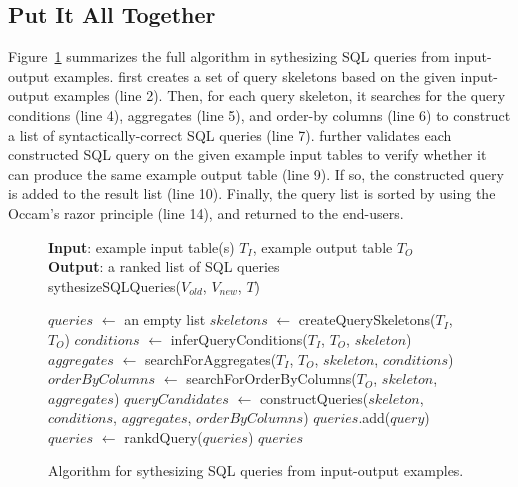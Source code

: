 \subsection{Put It All Together}
\label{sec:algorithm}

Figure~\ref{fig:algorithm} summarizes the full algorithm in sythesizing
SQL queries from input-output examples. \ourtool first creates a
set of query skeletons based on the given input-output examples (line 2). Then,
for each query skeleton, it searches for the query conditions (line 4),
aggregates (line 5), and order-by columns (line 6) to construct a list of syntactically-correct
SQL queries (line 7). \ourtool further validates each constructed SQL query
on the given example input tables to verify whether it can produce the same
example output table (line 9). If so, the constructed query is added to
the result list (line 10). Finally, the query list is sorted by using
the Occam's razor principle (line 14), and returned to the end-users.

\begin{figure}[t]

\textbf{Input}: example input table(s) $T_I$, example output table $T_O$\\

\vspace{-4mm}
\textbf{Output}: a ranked list of SQL queries\\
\vspace{1mm}
sythesizeSQLQueries({$V_{old}$, $V_{new}$, $T$})\\
\vspace{-5mm}
\begin{algorithmic}[1]
\STATE $\mathit{queries}$ $\leftarrow$ an empty list
\STATE $\mathit{skeletons}$ $\leftarrow$ createQuerySkeletons($\mathit{T_I}$, $\mathit{T_O}$)
\STATE $\mathit{conditions}$ $\leftarrow$ inferQueryConditions($\mathit{T_I}$, $\mathit{T_O}$, $\mathit{skeleton}$)
\STATE $\mathit{aggregates}$ $\leftarrow$ searchForAggregates($\mathit{T_I}$, $\mathit{T_O}$, $\mathit{skeleton}$, $conditions$)
\STATE $\mathit{orderByColumns}$ $\leftarrow$ searchForOrderByColumns($\mathit{T_O}$, $\mathit{skeleton}$, $\mathit{aggregates}$)
\STATE $\mathit{queryCandidates}$ $\leftarrow$ constructQueries($\mathit{skeleton}$, $\mathit{conditions}$, $\mathit{aggregates}$, $\mathit{orderByColumns}$)
\STATE $\mathit{queries}$.add($\mathit{query}$)
\ENDIF
\ENDFOR
\ENDFOR
\STATE $\mathit{queries}$ $\leftarrow$ rankdQuery($\mathit{queries}$)
\RETURN $\mathit{queries}$
\end{algorithmic}
\vspace{-3mm}
\caption{Algorithm for sythesizing SQL queries from input-output examples.}
 \label{fig:algorithm}
\end{figure}
